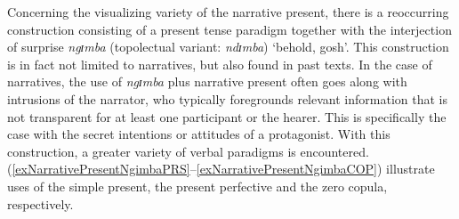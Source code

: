 Concerning the visualizing variety of the narrative present, there is a reoccurring construction consisting of a present tense paradigm together with the interjection of surprise \textit{ngɪmba} (topolectual variant: \textit{ndɪmba}) `behold, gosh'. This construction is in fact not limited to narratives, but also found in past  texts. In the case of narratives, the use of \textit{ngɪmba} plus narrative present often goes along with intrusions of the narrator, who typically foregrounds relevant information that is not transparent for at least one participant or the hearer. This is specifically the case with the secret intentions or attitudes of a protagonist. With this construction, a greater variety of verbal paradigms is encountered. (\ref{exNarrativePresentNgimbaPRS}--\ref{exNarrativePresentNgimbaCOP}) illustrate uses of the simple present, the present perfective and the zero copula, respectively.  


